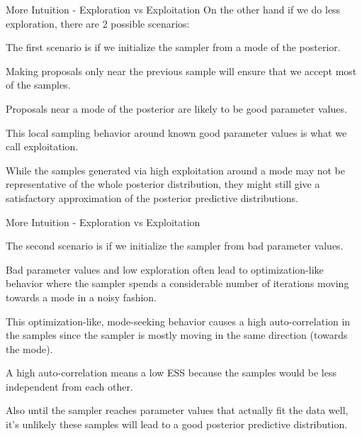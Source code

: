 \begin{frame}{More Intuition - Exploration vs Exploitation}
	On the other hand if we do less exploration, there are 2 possible scenarios:
	\begin{vfilleditems}
		\item The first scenario is if we initialize the sampler from a mode of the posterior.
			\begin{vfilleditems}
				\item Making proposals only near the previous sample will ensure that we accept most of the samples.
				\item Proposals near a mode of the posterior are likely to be good parameter values.
				\item This local sampling behavior around known good parameter values is what we call exploitation.
				\item While the samples generated via high exploitation around a mode may not be representative of the whole posterior distribution, they might still give a satisfactory approximation of the posterior predictive distributions.
			\end{vfilleditems}
	\end{vfilleditems}
\end{frame}
\begin{frame}{More Intuition - Exploration vs Exploitation}
	\begin{vfilleditems}
		\item The second scenario is if we initialize the sampler from bad parameter values.
			\begin{vfilleditems}
				\item Bad parameter values and low exploration often lead to optimization-like behavior where the sampler spends a considerable number of iterations moving towards a mode in a noisy fashion.
				\item This optimization-like, mode-seeking behavior causes a high auto-correlation in the samples since the sampler is mostly moving in the same direction (towards the mode).
				\item A high auto-correlation means a low ESS because the samples would be less independent from each other.
				\item Also until the sampler reaches parameter values that actually fit the data well, it's unlikely these samples will lead to a good posterior predictive distribution.
			\end{vfilleditems}
	\end{vfilleditems}
\end{frame}
